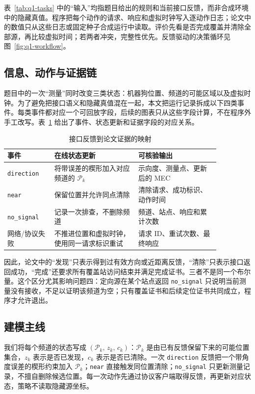 表~\ref{tab:q1-tasks} 中的“输入”均指题目给出的规则和当前接口反馈，而非合成环境中的隐藏真值。程序把每个动作的请求、响应和虚拟时钟写入逐动作日志；论文中的数值只从这些日志或固定种子合成运行中读取。评价先看是否完成覆盖并清除全部源，再比较虚拟时间；若两者冲突，完整性优先。反馈驱动的决策循环见图~\ref{fig:q1-workflow}。

\subsection{信息、动作与证据链}
题目中的一次“测量”同时改变三类状态：机器狗位置、频道的可能区域以及虚拟时钟。为了避免把接口语义和隐藏真值混在一起，本文把运行记录拆成以下四类事件。每类事件都对应一个可回放字段，后续的图表只从这些字段计算，不在程序外手工改写。表~\ref{tab:q1-evidence} 给出了事件、状态更新和证据字段的对应关系。

\begin{table}[H]\centering\small
\caption{接口反馈到论文证据的映射}\label{tab:q1-evidence}
\begin{tabular}{p{0.19\linewidth}p{0.34\linewidth}p{0.33\linewidth}}
\toprule
事件 & 在线状态更新 & 可核验输出 \\
\midrule
\texttt{direction} & 将带误差的楔形加入对应频道的 $\mathcal P_k$ & 示向度、测量点、更新后的 MEC \\
\texttt{near} & 保留位置并允许同点清除 & 清除请求、成功标识、动作时间 \\
\texttt{no\_signal} & 记录一次排查，不删除频道 & 频道、站点、响应和累计次数 \\
网络/协议失败 & 不推进位置和虚拟时钟，使用同一请求标识重试 & 请求 ID、重试次数、最终响应 \\
\bottomrule
\end{tabular}
\end{table}

因此，论文中的“发现”只表示得到过有效方向或近距离反馈，“清除”只表示接口返回成功，“完成”还要求所有覆盖站访问结束并满足完成证书。三者不是同一个布尔量。这个区分尤其影响问题四：定向源在某个站点返回 \texttt{no\_signal} 只说明当前测量没有接收，不足以证明该频道为空；只有覆盖证书和后续定位证书共同成立，程序才允许退出。

\subsection{建模主线}
我们将每个频道的状态写成 $(\mathcal P_k,\,z_k,\,c_k)$：$\mathcal P_k$ 是由已有反馈保留下来的可能位置集合，$z_k$ 表示是否已发现，$c_k$ 表示是否已清除。一次 \texttt{direction} 反馈把一个带角度误差的楔形约束加入 $\mathcal P_k$；\texttt{near} 直接触发同位置清除；\texttt{no\_signal} 只更新测量记录，不擅自删除候选位置。每一次动作先通过协议客户端取得反馈，再更新对应状态，策略不读取隐藏源坐标。

